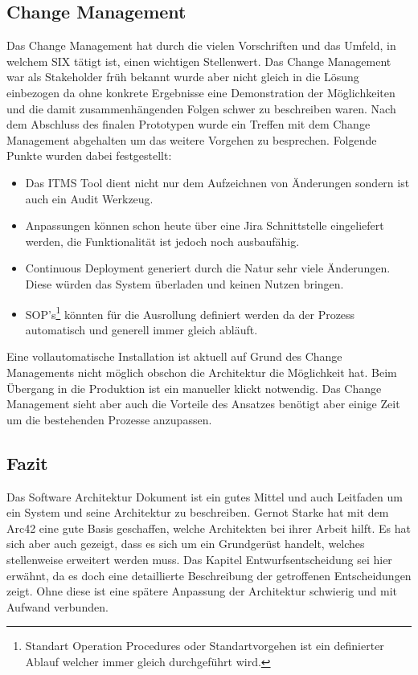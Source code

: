 \subsection{Change Management}

Das Change Management hat durch die vielen Vorschriften und das Umfeld, in welchem SIX tätigt ist, einen wichtigen Stellenwert. Das Change Management war als Stakeholder früh bekannt wurde aber nicht gleich in die Lösung einbezogen da ohne konkrete Ergebnisse eine Demonstration der Möglichkeiten und die damit zusammenhängenden Folgen schwer zu beschreiben waren. Nach dem Abschluss des finalen Prototypen wurde ein Treffen mit dem Change Management abgehalten um das weitere Vorgehen zu besprechen. Folgende Punkte wurden dabei festgestellt:
	
\begin{itemize}
	\item Das ITMS Tool dient nicht nur dem Aufzeichnen von Änderungen sondern ist auch ein Audit Werkzeug.
	\item Anpassungen können schon heute über eine Jira Schnittstelle eingeliefert werden, die Funktionalität ist jedoch noch ausbaufähig.
	\item Continuous Deployment generiert durch die Natur sehr viele Änderungen. Diese würden das System überladen und keinen Nutzen bringen.
	\item SOP's\footnote{Standart Operation Procedures oder Standartvorgehen ist ein definierter Ablauf welcher immer gleich durchgeführt wird.} könnten für die Ausrollung definiert werden da der Prozess automatisch und generell immer gleich abläuft. 
\end{itemize}

Eine vollautomatische Installation ist aktuell auf Grund des Change Managements nicht möglich obschon die Architektur die Möglichkeit hat. Beim Übergang in die Produktion ist ein manueller klickt notwendig. Das Change Management sieht aber auch die Vorteile des Ansatzes benötigt aber einige Zeit um die bestehenden Prozesse anzupassen. 

\subsection{Fazit}

Das Software Architektur Dokument ist ein gutes Mittel und auch Leitfaden um ein System und seine Architektur zu beschreiben. Gernot Starke hat mit dem Arc42 eine gute Basis geschaffen, welche Architekten bei ihrer Arbeit hilft. Es hat sich aber auch gezeigt, dass es sich um ein Grundgerüst handelt, welches stellenweise erweitert werden muss. Das Kapitel Entwurfsentscheidung sei hier erwähnt, da es doch eine detaillierte Beschreibung der getroffenen Entscheidungen zeigt. Ohne diese ist eine spätere Anpassung der Architektur schwierig und mit Aufwand verbunden.
\newpage
